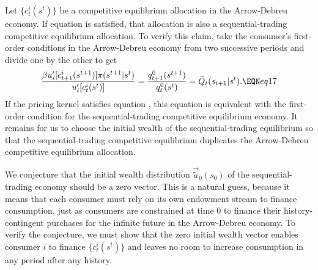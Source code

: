 Let
$\{c_t^i(s^t)\}$ be a competitive equilibrium allocation
in the Arrow-Debreu economy.
If equation  is satisfied, that allocation is also a
sequential-trading competitive equilibrium allocation.  To verify this claim,
take the consumer's first-order conditions  in the Arrow-Debreu
economy from two successive periods and divide one by
the other to get
$$ {\beta u'_i[c_{t+1}^i(s^{t+1})] \pi(s^{t+1} | s^t) \over
       u'_i[c_t^i(s^t)]} = {q^0_{t+1}(s^{t+1}) \over q_t^0(s^t) }
   = \tilde Q_t(s_{t+1}\vert s^t).  \EQN eq17 $$
If the pricing kernel satisfies equation , this equation
is equivalent with the first-order condition  for the sequential-trading
competitive equilibrium economy. It remains for us
to choose the initial wealth of the sequential-trading equilibrium so
that the sequential-trading competitive equilibrium duplicates the
Arrow-Debreu competitive equilibrium allocation.


We conjecture that the initial wealth distribution
$\vec {\tilde a}_0(s_0)$ of the sequential-trading economy should be a zero vector. This is a natural guess, because
it means that each consumer must rely on its own
endowment stream to finance consumption, just as consumers are
constrained at time $0$ to finance their history-contingent purchases
for the infinite future  in the Arrow-Debreu economy.
To  verify  the conjecture, we must show that the zero
initial wealth vector enables consumer $i$ to finance $\{c^i_t(s^t)\}$
and leaves no room to increase consumption in any period
 after any history.


